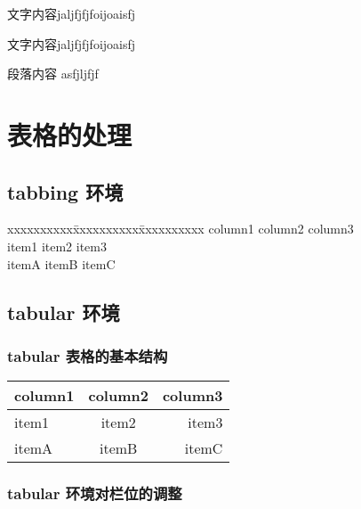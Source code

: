\documentclass{report}
\begin{document}
\parbox[t][22][3]{100}{文字内容jaljfjfjfoijoaisfj}
\parbox[b][22][3]{100}{文字内容jaljfjfjfoijoaisfj}

\begin{minipage}[c][22][3]{10}
  段落内容
  asfjljfjf
\end{minipage}


\chapter{表格的处理}
\section{tabbing 环境}
\begin{tabbing} %
xxxxxxxxxx\=xxxxxxxxxx\=xxxxxxxxxx \kill
column1 \> column2 \> column3 \\
item1   \> item2   \> item3   \\
itemA   \> itemB   \> itemC
\end{tabbing}

\section{tabular 环境}
\subsection{tabular 表格的基本结构}
\begin{tabular}[t]{lcr} %
\hline
column1 & column2 & column3 \\
\hline
\hline
item1   & item2   & item3 \\
itemA   & itemB   & itemC \\
\hline
\end{tabular}

\subsection{tabular 环境对栏位的调整}
\usepackage{textcomp}             %
\renewcommand{\arraystretch}{1.2} %
\arrayrulewidth=1pt               %
\tabcolsep=12pt                   %
\centering
\end{document}
